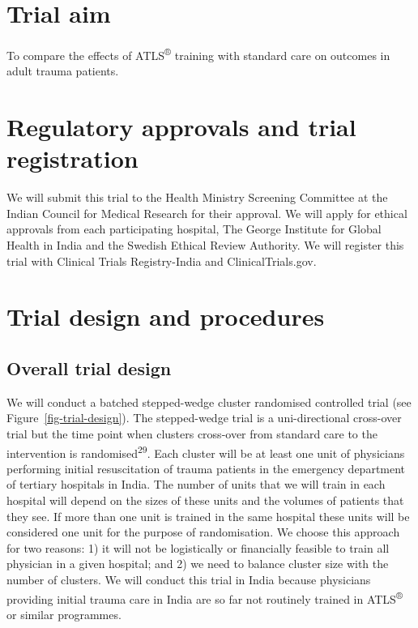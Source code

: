 \documentclass[
]{scrartcl}
\begin{document}
\hypertarget{trial-aim}{%
\section{Trial aim}\label{trial-aim}}

To compare the effects of ATLS\textsuperscript{®} training with standard
care on outcomes in adult trauma patients.

\hypertarget{regulatory-approvals-and-trial-registration}{%
\section{Regulatory approvals and trial
registration}\label{regulatory-approvals-and-trial-registration}}

We will submit this trial to the Health Ministry Screening Committee at
the Indian Council for Medical Research for their approval. We will
apply for ethical approvals from each participating hospital, The George
Institute for Global Health in India and the Swedish Ethical Review
Authority. We will register this trial with Clinical Trials
Registry-India and ClinicalTrials.gov.

\hypertarget{trial-design-and-procedures}{%
\section{Trial design and
procedures}\label{trial-design-and-procedures}}

\hypertarget{overall-trial-design}{%
\subsection{Overall trial design}\label{overall-trial-design}}

We will conduct a batched stepped-wedge cluster randomised controlled
trial (see Figure~\ref{fig-trial-design}). The stepped-wedge trial is a
uni-directional cross-over trial but the time point when clusters
cross-over from standard care to the intervention is
randomised\textsuperscript{29}. Each cluster will be at least one unit
of physicians performing initial resuscitation of trauma patients in the
emergency department of tertiary hospitals in India. The number of units
that we will train in each hospital will depend on the sizes of these
units and the volumes of patients that they see. If more than one unit
is trained in the same hospital these units will be considered one unit
for the purpose of randomisation. We choose this approach for two
reasons: 1) it will not be logistically or financially feasible to train
all physician in a given hospital; and 2) we need to balance cluster
size with the number of clusters. We will conduct this trial in India
because physicians providing initial trauma care in India are so far not
routinely trained in ATLS\textsuperscript{®} or similar programmes.
\end{document}
